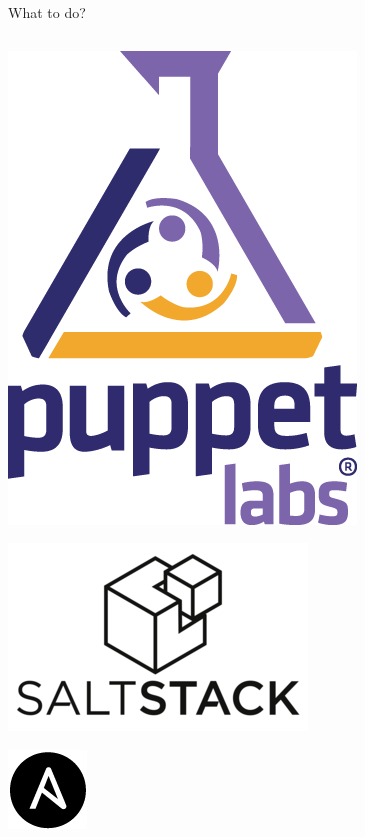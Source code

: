 \documentclass[16pt]{beamer}
\begin{document}
\begin{frame}{What to do?}
\begin{columns}[T]
\begin{column}{.4\textwidth}
    \includegraphics[scale=0.1]{images/logo_PL_vertical_RGB_lg.png}

    \includegraphics[scale=1.9]{images/logo_salt_stack.png}

    \includegraphics[scale=0.5]{images/logo_ansible.png}
    \end{column}
\end{columns}
\end{frame}
\end{document}
